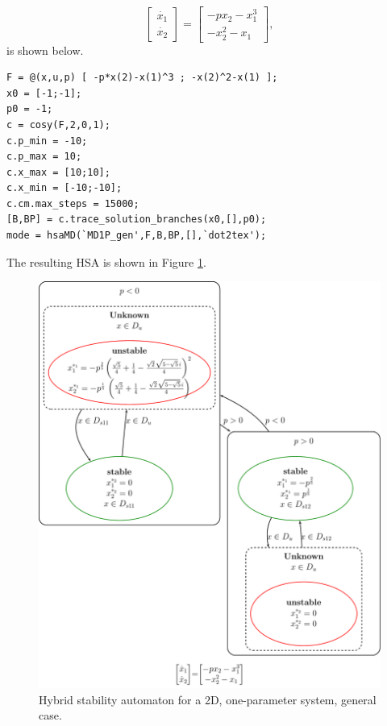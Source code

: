 \documentclass[12pt]{article}
\begin{document}
\begin{equation}
\begin{bmatrix}
\dot{x_1} \\ \dot{x_2}
\end{bmatrix}
=
\begin{bmatrix}
-px_2-x_1^3 \\ -x_2^2-x_1
\end{bmatrix},
\end{equation}
is shown below. 

\begin{addmargin}[0.5in]{1em}
\begin{lstlisting}
F = @(x,u,p) [ -p*x(2)-x(1)^3 ; -x(2)^2-x(1) ];
x0 = [-1;-1]; 
p0 = -1;
c = cosy(F,2,0,1);
c.p_min = -10; 
c.p_max = 10;
c.x_max = [10;10]; 
c.x_min = [-10;-10];
c.cm.max_steps = 15000;
[B,BP] = c.trace_solution_branches(x0,[],p0);
mode = hsaMD(`MD1P_gen',F,B,BP,[],`dot2tex');
\end{lstlisting}
\end{addmargin}

\noindent The resulting HSA is shown in Figure \ref{MD1P_gen}.

\begin{figure}[H]
\begin{center}
\includegraphics[width=4.5in]{MD1P_genTex.pdf}
\caption{Hybrid stability automaton for a 2D, one-parameter system, general case.}
\label{MD1P_gen}
\end{center}
\end{figure}
\end{document}
